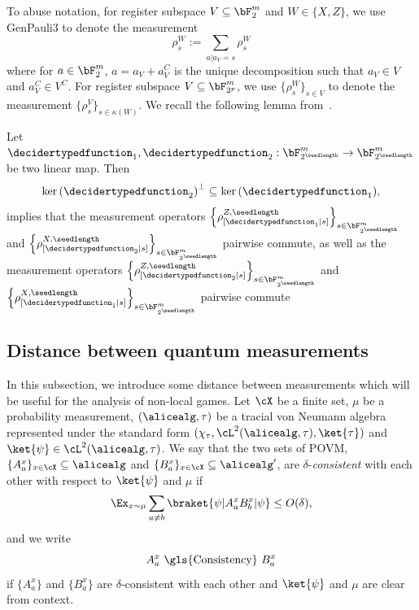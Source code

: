 To abuse notation, for register subspace $V \subseteq \bF_{2}^m$ and $W \in \{X,Z\}$, we use \gls{GenPauli3} to denote the measurement
\begin{equation*}
	\rho^{W}_{s} := \sum_{a| a_V = s} \rho^{W}_{s}
\end{equation*}
where for $a \in \bF_{2}^m$, $a = a_V + a_V^C$ is the unique decomposition such that $a_V \in V$ and $a_V^C \in V^C$. For register subspace $V \subseteq \bF_{2^p}^m$, we use $\{\rho^{W}_{s} \}_{s \in V}$ to denote the measurement  $\{\rho^{V}_{s} \}_{s \in \kappa(W)}$. We recall the following lemma from~\cite{jiMIPRE2022a}. 
\begin{lemma} \label{lem:linePaulicommutation}
	Let $\decidertypedfunction_1, \decidertypedfunction_2: \bF_{2^\seedlength}^m \rightarrow \bF_{2^\seedlength}^m$ be two linear map. Then
	\begin{equation*}
		\ker{\left(\decidertypedfunction_2\right)}^{\bot} \subseteq \ker{\left(\decidertypedfunction_1\right)},
	\end{equation*}
	implies that the measurement operators $\left\{\rho^{Z, \seedlength}_{[\decidertypedfunction_1|s]}\right\}_{s\in \bF_{2^\seedlength}^m}$ and $\left\{\rho^{X, \seedlength}_{[\decidertypedfunction_2|s]}\right\}_{s\in \bF_{2^\seedlength}^m}$ pairwise commute, as well as the measurement operators $\left\{\rho^{Z, \seedlength}_{[\decidertypedfunction_2|s]}\right\}_{s\in \bF_{2^\seedlength}^m}$ and $\left\{\rho^{X, \seedlength}_{[\decidertypedfunction_1|s]}\right\}_{s\in \bF_{2^\seedlength}^m}$ pairwise commute
\end{lemma}

\subsection{Distance between quantum measurements}

In this subsection, we introduce some distance between measurements which will be useful for the analysis of non-local games. Let $\cX$ be a finite set, $\mu$ be a probability measurement, $(\alicealg, \tau)$ be a tracial von Neumann algebra represented under the standard form $(\chi_{\tau}, \cL^2(\alicealg, \tau), \ket{\tau})$ and $\ket{\psi} \in \cL^2(\alicealg, \tau)$. We say that the two sets of POVM, $\{ A_a^x \}_{x \in \cX} \subseteq \alicealg$ and $\{ B_a^x \}_{x \in \cX} \subseteq \alicealg'$, are $\delta$-\textit{consistent} with each other with respect to $\ket{\psi}$ and $\mu$ if
\begin{equation} \label{eq:Consistencydef}
	\Ex_{x \sim \mu} \sum_{a \neq b} \braket{\psi|A_a^x B_b^x|\psi} \leq O(\delta),
\end{equation}
and we write 
\begin{equation*}
	A_a^x \text{ \gls{Consistency} }  B_a^x
\end{equation*}
if $\{ A_a^x \}$ and $\{ B_a^x \}$ are $\delta$-consistent with each other and $\ket{\psi}$ and $\mu$ are clear from context.


